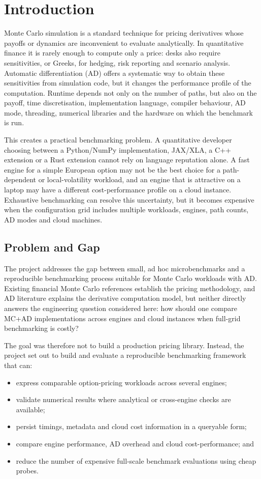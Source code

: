 \chapter{Introduction}
\label{chap:introduction}

Monte Carlo simulation is a standard technique for pricing derivatives whose payoffs or dynamics are inconvenient to evaluate analytically. In quantitative finance it is rarely enough to compute only a price: desks also require sensitivities, or Greeks, for hedging, risk reporting and scenario analysis. Automatic differentiation (AD) offers a systematic way to obtain these sensitivities from simulation code, but it changes the performance profile of the computation. Runtime depends not only on the number of paths, but also on the payoff, time discretisation, implementation language, compiler behaviour, AD mode, threading, numerical libraries and the hardware on which the benchmark is run.

This creates a practical benchmarking problem. A quantitative developer choosing between a Python/NumPy implementation, JAX/XLA, a C++ extension or a Rust extension cannot rely on language reputation alone. A fast engine for a simple European option may not be the best choice for a path-dependent or local-volatility workload, and an engine that is attractive on a laptop may have a different cost-performance profile on a cloud instance. Exhaustive benchmarking can resolve this uncertainty, but it becomes expensive when the configuration grid includes multiple workloads, engines, path counts, AD modes and cloud machines.

\section{Problem and Gap}

The project addresses the gap between small, ad hoc microbenchmarks and a reproducible benchmarking process suitable for Monte Carlo workloads with AD. Existing financial Monte Carlo references establish the pricing methodology, and AD literature explains the derivative computation model, but neither directly answers the engineering question considered here: how should one compare MC+AD implementations across engines and cloud instances when full-grid benchmarking is costly?

The goal was therefore not to build a production pricing library. Instead, the project set out to build and evaluate a reproducible benchmarking framework that can:
\begin{itemize}
    \item express comparable option-pricing workloads across several engines;
    \item validate numerical results where analytical or cross-engine checks are available;
    \item persist timings, metadata and cloud cost information in a queryable form;
    \item compare engine performance, AD overhead and cloud cost-performance; and
    \item reduce the number of expensive full-scale benchmark evaluations using cheap probes.
\end{itemize}

